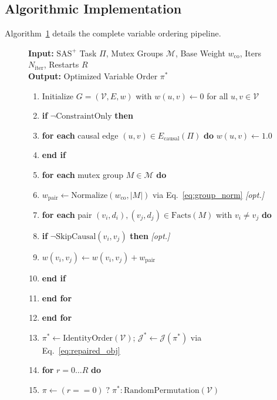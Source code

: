 \documentclass[twocolumn,10pt]{article}
\newcounter{myalgo}
\begin{document}
\subsection{Algorithmic Implementation}
Algorithm~\ref{alg:constraint_ordering} details the complete variable ordering pipeline.

\begin{figure}[htbp]
\label{alg:constraint_ordering}
\begin{pseudobox}
\small
\textbf{Input:} $\text{SAS}^+$ Task $\Pi$, Mutex Groups $\mathcal{M}$, Base Weight $w_{\text{co}}$, Iters $N_{\text{iter}}$, Restarts $R$\\
\textbf{Output:} Optimized Variable Order $\pi^*$
\begin{enumerate}\setlength{\itemsep}{0pt}\small
    \item Initialize $G = (\mathcal{V}, E, w)$ with $w(u, v) \leftarrow 0$ for all $u, v \in \mathcal{V}$
    \item \textbf{if} $\neg \text{ConstraintOnly}$ \textbf{then}
    \item \quad \textbf{for each} causal edge $(u, v) \in E_{\text{causal}}(\Pi)$ \textbf{do} $w(u, v) \leftarrow 1.0$
    \item \textbf{end if}
    \item \textbf{for each} mutex group $M \in \mathcal{M}$ \textbf{do}
    \item \quad $w_{\text{pair}} \leftarrow \text{Normalize}(w_{\text{co}}, |M|)$ via Eq.~\ref{eq:group_norm} \hfill \textit{[opt.]}
    \item \quad \textbf{for each} pair $(v_i, d_i), (v_j, d_j) \in \text{Facts}(M)$ with $v_i \neq v_j$ \textbf{do}
    \item \quad \quad \textbf{if} $\neg \text{SkipCausal}(v_i, v_j)$ \textbf{then} \hfill \textit{[opt.]}
    \item \quad \quad \quad $w(v_i, v_j) \leftarrow w(v_i, v_j) + w_{\text{pair}}$
    \item \quad \quad \textbf{end if}
    \item \quad \textbf{end for}
    \item \textbf{end for}
    \item $\pi^* \leftarrow \text{IdentityOrder}(\mathcal{V})$; \quad $\mathcal{J}^* \leftarrow \mathcal{J}(\pi^*)$ via Eq.~\ref{eq:repaired_obj}
    \item \textbf{for} $r = 0 \dots R$ \textbf{do}
    \item \quad $\pi \leftarrow (r == 0) \; ? \; \pi^* : \text{RandomPermutation}(\mathcal{V})$

\end{enumerate}
\end{pseudobox}
\end{figure}
\end{document}
